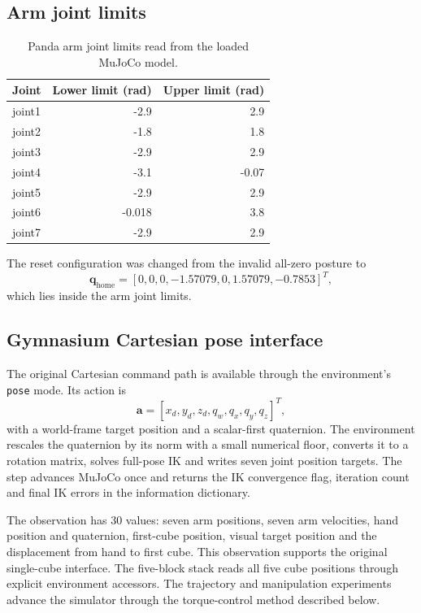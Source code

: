 \documentclass[12pt,a4paper]{article}
\begin{document}
\subsection{Arm joint limits}
\begin{table}[!htbp]
\centering
\caption{Panda arm joint limits read from the loaded MuJoCo model.}
\begin{tabular}{lrr}
\toprule
Joint & Lower limit (rad) & Upper limit (rad)\\
\midrule
joint1 & -2.9 & 2.9\\
joint2 & -1.8 & 1.8\\
joint3 & -2.9 & 2.9\\
joint4 & -3.1 & -0.07\\
joint5 & -2.9 & 2.9\\
joint6 & -0.018 & 3.8\\
joint7 & -2.9 & 2.9\\
\bottomrule
\end{tabular}
\end{table}

The reset configuration was changed from the invalid all-zero posture to
\begin{equation}
\bm q_{\mathrm{home}}=[0,0,0,-1.57079,0,1.57079,-0.7853]^T,
\end{equation}
which lies inside the arm joint limits.



\subsection{Gymnasium Cartesian pose interface}
The original Cartesian command path is available through the environment's \texttt{pose} mode. Its action is
\[
\bm a=[x_d,y_d,z_d,q_w,q_x,q_y,q_z]^T,
\]
with a world-frame target position and a scalar-first quaternion. The environment rescales the quaternion by its norm with a small numerical floor, converts it to a rotation matrix, solves full-pose IK and writes seven joint position targets. The step advances MuJoCo once and returns the IK convergence flag, iteration count and final IK errors in the information dictionary.

The observation has 30 values: seven arm positions, seven arm velocities, hand position and quaternion, first-cube position, visual target position and the displacement from hand to first cube. This observation supports the original single-cube interface. The five-block stack reads all five cube positions through explicit environment accessors. The trajectory and manipulation experiments advance the simulator through the torque-control method described below.
\end{document}
